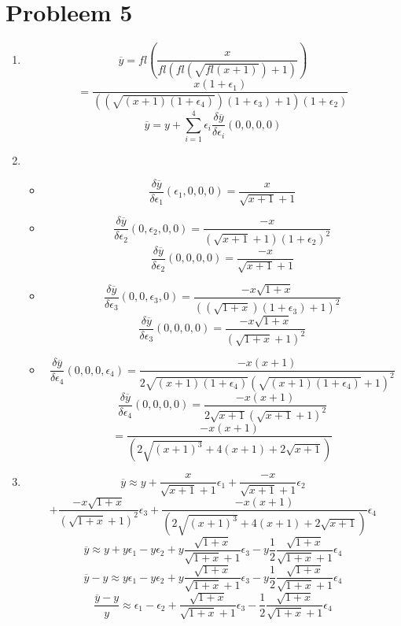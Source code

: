 \documentclass[12pt,a4paper]{article}
\begin{document}
\section{Probleem 5}
\begin{enumerate}
\item
\[
\overline{y} =
fl\left(
\frac{x}{fl\left(fl\left(\sqrt{fl\left(x+1\right)}\right)+1\right)}
\right)
\]
\[
=
\frac{x(1+\epsilon_1)}{\left(\left(\sqrt{\left(x+1\right)(1+\epsilon_4)}\right)(1+\epsilon_3)+1\right)(1+\epsilon_2)}
\]
\[
\overline{y} = y + \sum_{i=1}^4\epsilon_i\frac{\delta \overline{y}}{\delta\epsilon_i}(0,0,0,0)
\]
\item
\begin{itemize}
\item
\[
\frac{\delta \overline{y}}{\delta \epsilon_1}(\epsilon_1,0,0,0)
= \frac{x}{\sqrt{x+1}+1}
\]
\item
\[
\frac{\delta \overline{y}}{\delta \epsilon_2}(0,\epsilon_2,0,0)
= \frac{-x}{\left(\sqrt{x+1}+1\right)(1+\epsilon_2)^2}
\]
\[
\frac{\delta \overline{y}}{\delta \epsilon_2}(0,0,0,0)
= \frac{-x}{\sqrt{x+1}+1}
\]
\item
\[
\frac{\delta \overline{y}}{\delta \epsilon_3}(0,0,\epsilon_3,0)
= \frac{-x\sqrt{1+x}}{\left((\sqrt{1+x})(1+\epsilon_3)+1\right)^2}
\]
\[
\frac{\delta \overline{y}}{\delta \epsilon_3}(0,0,0,0)
= \frac{-x\sqrt{1+x}}{\left(\sqrt{1+x}+1\right)^2}
\]
\item
\[
\frac{\delta \overline{y}}{\delta \epsilon_4}(0,0,0,\epsilon_4)
= \frac{-x(x+1)}{2\sqrt{(x+1)(1+\epsilon_4)}\left(\sqrt{(x+1)(1+\epsilon_4)}+1\right)^2}
\]
\[
\frac{\delta \overline{y}}{\delta \epsilon_4}(0,0,0,0)
= \frac{-x(x+1)}{2\sqrt{x+1}\left(\sqrt{x+1}+1\right)^2}
\]
\[
= \frac{-x(x+1)}{(2\sqrt{(x+1)^3}+ 4(x+1)+2\sqrt{x+1})}
\]
\end{itemize}
\item
\[
\overline{y} \approx y +
\frac{x}{\sqrt{x+1}+1} \epsilon_1
+
\frac{-x}{\sqrt{x+1}+1} \epsilon_2
\]\[
+
\frac{-x\sqrt{1+x}}{\left(\sqrt{1+x}+1\right)^2} \epsilon_3
+
\frac{-x(x+1)}{(2\sqrt{(x+1)^3}+ 4(x+1)+2\sqrt{x+1})} \epsilon_4
\]
\[
\overline{y}
\approx
y+
y \epsilon_1
-
y \epsilon_2
+
y \frac{\sqrt{1+x}}{\sqrt{1+x}+1} \epsilon_3
-
y \frac{1}{2}\frac{\sqrt{1+x}}{\sqrt{1+x}+1} \epsilon_4
\]
\[
\overline{y}-y
\approx
y \epsilon_1
-
y \epsilon_2
+
y \frac{\sqrt{1+x}}{\sqrt{1+x}+1} \epsilon_3
-
y \frac{1}{2}\frac{\sqrt{1+x}}{\sqrt{1+x}+1} \epsilon_4
\]
\[
\frac{\overline{y} - y}{y}
\approx
\epsilon_1
-
\epsilon_2
+
\frac{\sqrt{1+x}}{\sqrt{1+x}+1} \epsilon_3
-
\frac{1}{2}\frac{\sqrt{1+x}}{\sqrt{1+x}+1} \epsilon_4
\]
\end{enumerate}
\end{document}
